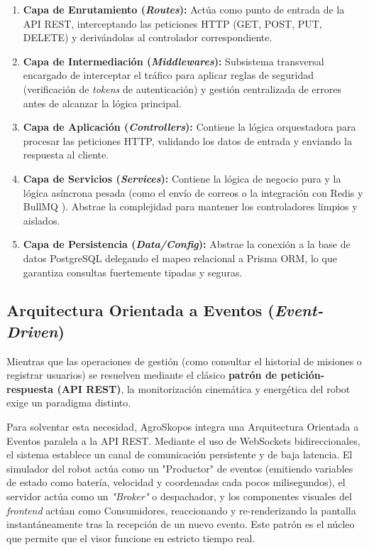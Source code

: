 \begin{enumerate}
    \item \textbf{Capa de Enrutamiento (\textit{Routes}):} Actúa como punto de entrada de la API REST, interceptando las peticiones HTTP (GET, POST, PUT, DELETE) y derivándolas al controlador correspondiente.
    \item \textbf{Capa de Intermediación (\textit{Middlewares}):} Subsistema transversal encargado de interceptar el tráfico para aplicar reglas de seguridad (verificación de \textit{tokens} de autenticación) y gestión centralizada de errores antes de alcanzar la lógica principal.
    \item \textbf{Capa de Aplicación (\textit{Controllers}):} Contiene la lógica orquestadora para procesar las peticiones HTTP, validando los datos de entrada y enviando la respuesta al cliente.
    \item \textbf{Capa de Servicios (\textit{Services}):} Contiene la lógica de negocio pura y la lógica asíncrona pesada (como el envío de correos o la integración con Redis \cite{redis} y BullMQ \cite{bullmq}). Abstrae la complejidad para mantener los controladores limpios y aislados.
    \item \textbf{Capa de Persistencia (\textit{Data/Config}):} Abstrae la conexión a la base de datos PostgreSQL \cite{postgresql} delegando el mapeo relacional a Prisma ORM, lo que garantiza consultas fuertemente tipadas y seguras.
\end{enumerate}

\subsection{Arquitectura Orientada a Eventos (\textit{Event-Driven})}

Mientras que las operaciones de gestión (como consultar el historial de misiones o registrar usuarios) se resuelven mediante el clásico \textbf{patrón de petición-respuesta (API REST)}, la monitorización cinemática y energética del robot exige un paradigma distinto.

Para solventar esta necesidad, AgroSkopos integra una Arquitectura Orientada a Eventos paralela a la API REST. Mediante el uso de WebSockets bidireccionales, el sistema establece un canal de comunicación persistente y de baja latencia. El simulador del robot actúa como un "Productor" de eventos (emitiendo variables de estado como batería, velocidad y coordenadas cada pocos milisegundos), el servidor actúa como un \textit{"Broker"} o despachador, y los componentes visuales del \textit{frontend} actúan como Consumidores, reaccionando y re-renderizando la pantalla instantáneamente tras la recepción de un nuevo evento. Este patrón es el núcleo que permite que el visor funcione en estricto tiempo real.

